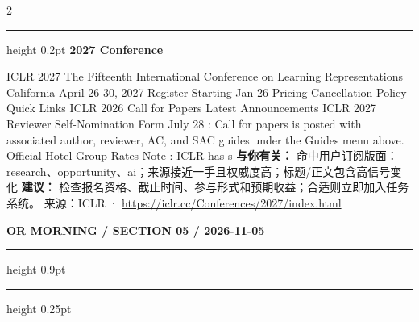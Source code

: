 \documentclass[10.5pt]{ctexart}
\begin{document}
\begin{multicols}{2}
\vspace{2mm}
\hrule height 0.2pt
\vspace{2mm}
{\large\bfseries 2027 Conference}\par
ICLR 2027 The Fifteenth International Conference on Learning Representations California April 26-30, 2027 Register Starting Jan 26 Pricing Cancellation Policy Quick Links ICLR 2026 Call for Papers Latest Announcements ICLR 2027 Reviewer Self-Nomination Form July 28 : Call for papers is posted with associated author, reviewer, AC, and SAC guides under the Guides menu above. Official Hotel Group Rates Note : ICLR has s
\textbf{与你有关：} 命中用户订阅版面：research、opportunity、ai；来源接近一手且权威度高；标题/正文包含高信号变化
\textbf{建议：} 检查报名资格、截止时间、参与形式和预期收益；合适则立即加入任务系统。
{\footnotesize\color{ormuted} 来源：ICLR · \url{https://iclr.cc/Conferences/2027/index.html}}
\end{multicols}
\newpage
{\small\bfseries OR MORNING / SECTION 05 / 2026-11-05}
\vspace{2mm}
\hrule height 0.9pt
\vspace{1.5mm}
\hrule height 0.25pt
\vspace{4mm}
\end{document}
